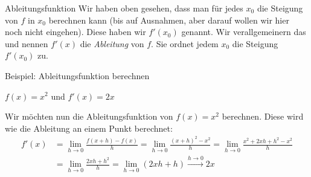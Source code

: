 \begin{bla}{Ableitungsfunktion}
  Wir haben oben gesehen, dass man für jedes $x_0$ die Steigung von $f$ in $x_0$ berechnen kann (bis auf Ausnahmen, aber darauf wollen wir hier noch nicht eingehen). Diese haben wir $f'(x_0)$ genannt. Wir verallgemeinern das und nennen $f'(x)$ die \emph{Ableitung} von $f$. Sie ordnet jedem $x_0$ die Steigung $f'(x_0)$ zu.
\end{bla}



\begin{bla}{Beispiel: Ableitungsfunktion berechnen}
  \begin{marginfigure}
    \caption{$f(x)=x^2$ und $f'(x)=2x$}
  \end{marginfigure}

  Wir möchten nun die Ableitungsfunktion von $f(x)=x^2$ berechnen. Diese wird wie die Ableitung an einem Punkt berechnet: \\
  \begin{equation*}
    \begin{split}
      f'(x) & = \lim\limits_{h \to 0}\frac{f(x+h)-f(x)}{h} = \lim\limits_{h \to 0}\frac{{(x+h)}^2-x^2}{h} = \lim\limits_{h \to 0}\frac{x^2+2xh+h^2-x^2}{h} \\
      & = \lim\limits_{h \to 0}\frac{2xh+h^2}{h} = \lim\limits_{h \to 0}(2xh+h)\xrightarrow{h\rightarrow 0}2x
    \end{split}
  \end{equation*}
\end{bla}



